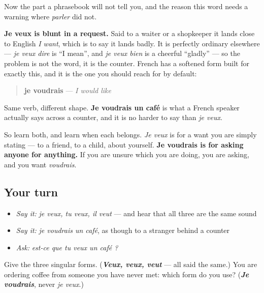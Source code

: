 \begin{culture}
Now the part a phrasebook will not tell you, and the reason this word needs a warning where \emph{parler} did not.

\textbf{Je veux is blunt in a request.} Said to a waiter or a shopkeeper it lands close to English \emph{I want}, which is to say it lands badly. It is perfectly ordinary elsewhere — \emph{je veux dire} is \textquotedblleft{}I mean\textquotedblright{}, and \emph{je veux bien} is a cheerful \textquotedblleft{}gladly\textquotedblright{} — so the problem is not the word, it is the counter. French has a softened form built for exactly this, and it is the one you should reach for by default:

\begin{quote}
\textbf{je voudrais} — \emph{I would like}
\end{quote}

Same verb, different shape. \textbf{Je voudrais un café} is what a French speaker actually says across a counter, and it is no harder to say than \emph{je veux}.

So learn both, and learn when each belongs. \emph{Je veux} is for a want you are simply stating — to a friend, to a child, about yourself. \textbf{Je voudrais is for asking anyone for anything.} If you are unsure which you are doing, you are asking, and you want \emph{voudrais}.
\end{culture}

\subsection*{Your turn}
\begin{itemize}
\raggedright
  \item \emph{Say it:} \emph{je veux, tu veux, il veut} — and hear that all three are the same sound
  \item \emph{Say it:} \emph{je voudrais un café}, as though to a stranger behind a counter
  \item \emph{Ask:} \emph{est-ce que tu veux un café ?}
\end{itemize}

\begin{tcolorbox}[breakable,colback=teal!4,colframe=teal!35!black,title={Before you move on}]
Give the three singular forms. (\emph{\textbf{Veux, veux, veut}} — all said the same.) You are ordering coffee from someone you have never met: which form do you use? (\emph{\textbf{Je voudrais}}, never \emph{je veux}.)
\end{tcolorbox}
